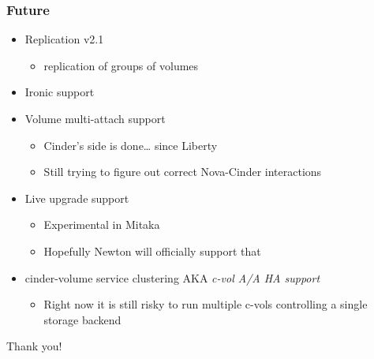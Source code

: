 \documentclass[aspectratio=169]{beamer}
\begin{document}
\begin{frame}
    \frametitle{Future}
    \begin{itemize}
        \item Replication v2.1
        \begin{itemize}
            \item replication of groups of volumes
        \end{itemize}
        \pause
        \item Ironic support
        \pause
        \item Volume multi-attach support
        \begin{itemize}
            \item Cinder's side is done… \pause since Liberty
            \item Still trying to figure out correct Nova-Cinder interactions
        \end{itemize}
        \pause
        \item Live upgrade support
        \begin{itemize}
            \item Experimental in Mitaka
            \item Hopefully Newton will officially support that
        \end{itemize}
        \pause
        \item cinder-volume service clustering AKA \emph{c-vol A/A HA support}
        \begin{itemize}
            \item Right now it is still risky to run multiple c-vols controlling a single storage backend
        \end{itemize}
    \end{itemize}
\end{frame}

\begin{frame}
    \begin{center}
        \huge Thank you!
    \end{center}
\end{frame}
\end{document}
